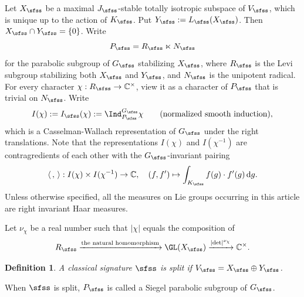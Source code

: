 \documentclass[11pt,a4paper]{amsart}
\def\abs#1{\left|{#1}\right|}
\newcommand{\od}{\operatorname{d}}
\newcommand{\la}{\langle}
\newcommand{\ra}{\rangle}
\newcommand{\be}{\begin {equation}}
\newcommand{\ee}{\end {equation}}
\numberwithin{equation}{section}
\newtheorem{defn}[thm]{Definition}
\theoremstyle{remark}
\begin{document}
Let $X_\sfss$ be a maximal $J_\sfss$-stable totally isotropic subspace of $V_\sfss$, which is unique  up to the action of $K_\sfss$. Put $Y_\sfss:=L_\sfss(X_\sfss)$. Then $X_\sfss\cap Y_\sfss=\{0\}$.
Write
\[
P_\sfss=R_\sfss\ltimes N_\sfss
\]
 for the parabolic subgroup of $G_\sfss$ stabilizing $X_\sfss$, where $R_\sfss$ is the Levi subgroup stabilizing both $X_\sfss$ and $Y_\sfss$, and $N_\sfss$ is the unipotent radical. For every character $\chi: R_\sfss\rightarrow \C^\times$, view it as a character of $P_\sfss$ that is trivial on $N_\sfss$. Write
\[
  I(\chi):=I_\sfss(\chi):=\Ind_{P_\sfss}^{G_\sfss}\chi \qquad(\textrm{normalized smooth induction}),
\]
which is a Casselman-Wallach representation of $G_\sfss$ under the right translations. Note that the representations   $I(\chi)$ and $ I(\chi^{-1})$ are contragredients of each other with the $G_\sfss$-invariant pairing
 \[
  \la\,,\,\ra:  I(\chi)\times I(\chi^{-1})\rightarrow \C, \quad (f, f')\mapsto \int_{K_\sfss} f(g) \cdot f'(g) \od\!g.
 \]
 Unless otherwise specified, all the measures on Lie groups occurring  in this article are  right invariant Haar measures.

Let $\nu_\chi$ be a real number such that $\abs{\chi}$ equals the composition of
\be\label{nuchi}
   R_\sfss\xrightarrow{\textrm{the natural homomorphism} }\GL(X_\sfss)\xrightarrow{\abs{\det}^{\nu_\chi}} \C^\times.
\ee

\begin{defn}
A classical signature $\sfss$ is split if $V_\sfss=X_\sfss\oplus Y_\sfss$.
\end{defn}

When $\sfss$ is split, $P_\sfss$ is called a Siegel parabolic subgroup of $G_\sfss$.
\end{document}
